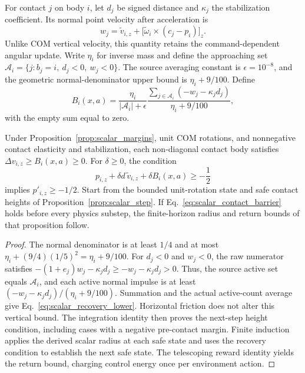 For contact $j$ on body $i$, let $d_j$ be signed distance and $\kappa_j$ the stabilization coefficient.
Its normal point velocity after acceleration is
\begin{equation}
 w_j=\widetilde v_{i,z}+
       \bigl[\widetilde\omega_i\mathbin{\times}(c_j-p_i)\bigr]_z.
\end{equation}
Unlike COM vertical velocity, this quantity retains the command-dependent angular update.
Write $\eta_i$ for inverse mass and define the approaching set
$\mathcal A_i=\{j:b_j=i,\ d_j<0,\ w_j<0\}$.
The source averaging constant is $\epsilon=10^{-8}$, and the geometric normal-denominator upper bound is $\eta_i+9/100$.
Define
\begin{equation}
 B_i(x,a)=\frac{\eta_i}{|\mathcal A_i|+\epsilon}
          \frac{\sum_{j\in\mathcal A_i}(-w_j-\kappa_jd_j)}{\eta_i+9/100},
 \label{eq:scalar_recovery_lower}
\end{equation}
with the empty sum equal to zero.

\begin{proposition}
\label{prop:contact_barrier}
Under Proposition~\ref{prop:scalar_margins}, unit COM rotations, and nonnegative contact elasticity and stabilization, each non-diagonal contact body satisfies $\Delta v_{i,z}\ge B_i(x,a)\ge0$.
For $\delta\ge0$, the condition
\begin{equation}
 p_{i,z}+\delta d\,\widetilde v_{i,z}+\delta B_i(x,a)\ge-\frac12
 \label{eq:scalar_contact_barrier}
\end{equation}
implies $p'_{i,z}\ge-1/2$.
Start from the bounded unit-rotation state and safe contact heights of Proposition~\ref{prop:scalar_step}.
If Eq.~\eqref{eq:scalar_contact_barrier} holds before every physics substep, the finite-horizon radius and return bounds of that proposition follow.
\end{proposition}

\begin{proof}
The normal denominator is at least $1/4$ and at most $\eta_i+(9/4)(1/5)^2=\eta_i+9/100$.
For $d_j<0$ and $w_j<0$, the raw numerator satisfies
$-(1+e_j)w_j-\kappa_jd_j\ge-w_j-\kappa_jd_j>0$.
Thus, the source active set equals $\mathcal A_i$, and each active normal impulse is at least $(-w_j-\kappa_jd_j)/(\eta_i+9/100)$.
Summation and the actual active-count average give Eq.~\eqref{eq:scalar_recovery_lower}.
Horizontal friction does not alter this vertical bound.
The integration identity then proves the next-step height condition, including cases with a negative pre-contact margin.
Finite induction applies the derived scalar radius at each safe state and uses the recovery condition to establish the next safe state.
The telescoping reward identity yields the return bound, charging control energy once per environment action.
\end{proof}

